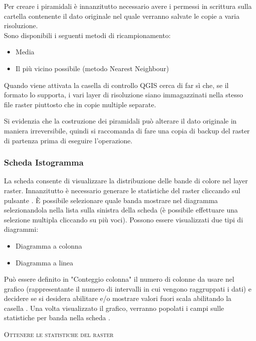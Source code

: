 Per creare i piramidali è innanzitutto necessario avere i permessi in scrittura
sulla cartella contenente il dato originale nel quale verranno salvate le
copie a varia risoluzione. \\
Sono disponibili i seguenti metodi di ricampionamento:
\begin{itemize}
\item Media
\item Il più vicino possibile (metodo Nearest Neighbour)
\end{itemize}

Quando viene attivata la casella di controllo  QGIS cerca di far sì che, se il formato lo supporta, i vari
layer di risoluzione siano immagazzinati nella stesso file raster piuttosto
che in copie multiple separate.

Si evidenzia che la costruzione dei piramidali può alterare il dato originale
in maniera irreversibile, quindi si raccomanda di fare una copia di backup del
raster di partenza prima di eseguire l'operazione.

\subsubsection{Scheda Istogramma}\label{label_histogram}

La scheda  consente di visualizzare la distribuzione
 delle bande di colore nel layer raster.
Innanzitutto è necessario generare le statistiche del raster cliccando sul
pulsante . È possibile selezionare quale banda mostrare nel
diagramma selezionandola nella lista sulla sinistra della scheda (è
possibile effettuare una selezione multipla cliccando su più voci).
Possono essere visualizzati due tipi di diagrammi: 

\begin{itemize}
\item Diagramma a colonna
\item Diagramma a linea
\end{itemize}

Può essere definito in "Conteggio colonna" il numero di colonne da usare nel grafico
(rappresentante il numero di intervalli in cui vengono raggruppati i dati)
e decidere se si desidera abilitare  e/o
mostrare valori fuori scala abilitando la casella . Una volta visualizzato il grafico, verranno popolati i campi sulle
statistiche per banda nella scheda .

\begin{Tip}\caption{\textsc{Ottenere le statistiche del raster}}
\end{Tip}

